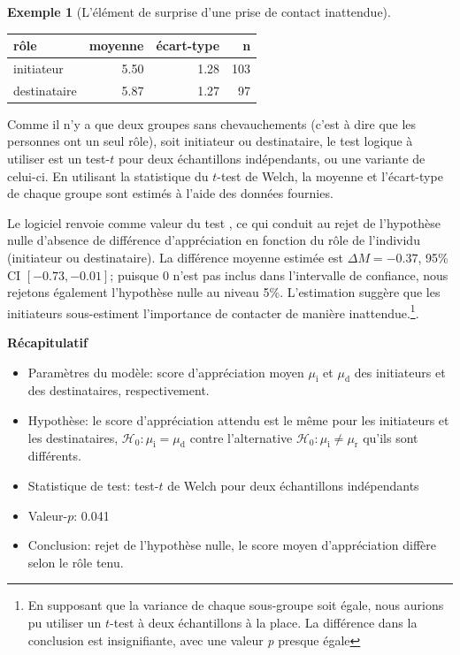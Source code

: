 \documentclass[
  11pt,
  letterpaper,
]{scrbook}
\providecommand{\tightlist}{%
  \setlength{\itemsep}{0pt}\setlength{\parskip}{0pt}}\usepackage{longtable,booktabs,array}
\theoremstyle{plain}
\theoremstyle{plain}
\theoremstyle{definition}
\newtheorem{example}{Exemple}[chapter]
\theoremstyle{definition}
\theoremstyle{remark}
\begin{document}
\begin{example}[L'élément de surprise d'une prise de contact
inattendue]
\begin{longtable}[t]{lrrr}
\toprule
rôle & moyenne & écart-type & n\\
\midrule
initiateur & 5.50 & 1.28 & 103\\
destinataire & 5.87 & 1.27 & 97\\
\bottomrule

\end{longtable}

Comme il n'y a que deux groupes sans chevauchements (c'est à dire que
les personnes ont un seul rôle), soit initiateur ou destinataire, le
test logique à utiliser est un test-\(t\) pour deux échantillons
indépendants, ou une variante de celui-ci. En utilisant la statistique
du \(t\)-test de Welch, la moyenne et l'écart-type de chaque groupe sont
estimés à l'aide des données fournies.

Le logiciel renvoie comme valeur du test , ce qui conduit au rejet de
l'hypothèse nulle d'absence de différence d'appréciation en fonction du
rôle de l'individu (initiateur ou destinataire). La différence moyenne
estimée est \(\Delta M = -0.37\), 95\% CI \([-0.73, -0.01]\); puisque
\(0\) n'est pas inclus dans l'intervalle de confiance, nous rejetons
également l'hypothèse nulle au niveau 5\%. L'estimation suggère que les
initiateurs sous-estiment l'importance de contacter de manière
inattendue.\footnote{En supposant que la variance de chaque sous-groupe
  soit égale, nous aurions pu utiliser un \(t\)-test à deux échantillons
  à la place. La différence dans la conclusion est insignifiante, avec
  une valeur \emph{p} presque égale}.

\textbf{Récapitulatif}

\begin{itemize}
\tightlist
\item
  Paramètres du modèle: score d'appréciation moyen \(\mu_{\mathrm{i}}\)
  et \(\mu_{\mathrm{d}}\) des initiateurs et des destinataires,
  respectivement.
\item
  Hypothèse: le score d'appréciation attendu est le même pour les
  initiateurs et les destinataires,
  \(\mathscr{H}_0: \mu_{\mathrm{i}}=\mu_{\mathrm{d}}\) contre
  l'alternative
  \(\mathscr{H}_0: \mu_{\mathrm{i}} \neq \mu_{\mathrm{r}}\) qu'ils sont
  différents.
\item
  Statistique de test: test-\(t\) de Welch pour deux échantillons
  indépendants
\item
  Valeur-\(p\): 0.041
\item
  Conclusion: rejet de l'hypothèse nulle, le score moyen d'appréciation
  diffère selon le rôle tenu.
\end{itemize}

\end{example}
\end{document}
